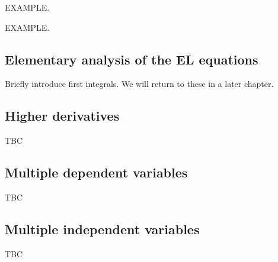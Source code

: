 EXAMPLE.

EXAMPLE.

\subsection{Elementary analysis of the EL equations}

Briefly introduce first integrals. We will return to these in a later chapter.

\subsection{Higher derivatives}
TBC

\subsection{Multiple dependent variables}
TBC

\subsection{Multiple independent variables}
TBC
